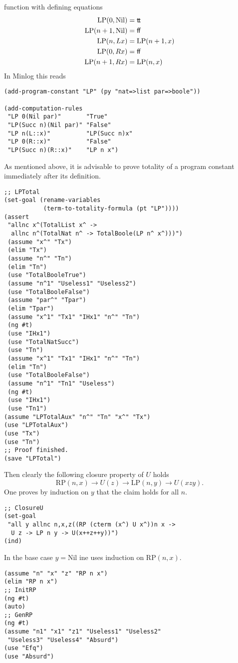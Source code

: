 \documentclass[12pt]{amsart}
\newcommand{\nil}{\mathrm{Nil}}
\newcommand{\false}{\mathsf{f\kern-0.14em f}}
\newcommand{\true}{\mathsf{t\kern-0.14em t}}
\begin{document}
function with defining equations
\begin{align*}
  \mathrm{LP}(0,\nil) &= \true
  \\
  \mathrm{LP}(n+1,\nil) &= \false
  \\
  \mathrm{LP}(n,Lx) &= \mathrm{LP}(n+1,x)
  \\
  \mathrm{LP}(0,Rx) &= \false
  \\
  \mathrm{LP}(n+1,Rx) &= \mathrm{LP}(n,x)
\end{align*}
In Minlog this reads
\begin{verbatim}
(add-program-constant "LP" (py "nat=>list par=>boole"))

(add-computation-rules
 "LP 0(Nil par)"       "True"
 "LP(Succ n)(Nil par)" "False"
 "LP n(L::x)"          "LP(Succ n)x"
 "LP 0(R::x)"          "False"
 "LP(Succ n)(R::x)"    "LP n x")
\end{verbatim}
As mentioned above, it is advisable to prove totality of a program
constant immediately after its definition.
\begin{verbatim}
;; LPTotal
(set-goal (rename-variables
           (term-to-totality-formula (pt "LP"))))
(assert
 "allnc x^(TotalList x^ ->
  allnc n^(TotalNat n^ -> TotalBoole(LP n^ x^)))")
 (assume "x^" "Tx")
 (elim "Tx")
 (assume "n^" "Tn")
 (elim "Tn")
 (use "TotalBooleTrue")
 (assume "n^1" "Useless1" "Useless2")
 (use "TotalBooleFalse")
 (assume "par^" "Tpar")
 (elim "Tpar")
 (assume "x^1" "Tx1" "IHx1" "n^" "Tn")
 (ng #t)
 (use "IHx1")
 (use "TotalNatSucc")
 (use "Tn")
 (assume "x^1" "Tx1" "IHx1" "n^" "Tn")
 (elim "Tn")
 (use "TotalBooleFalse")
 (assume "n^1" "Tn1" "Useless")
 (ng #t)
 (use "IHx1")
 (use "Tn1")
(assume "LPTotalAux" "n^" "Tn" "x^" "Tx")
(use "LPTotalAux")
(use "Tx")
(use "Tn")
;; Proof finished.
(save "LPTotal")
\end{verbatim}
Then clearly the following closure property of $U$ holds
\begin{equation*}
  \mathrm{RP}(n,x) \to U(z) \to \mathrm{LP}(n,y) \to U(xzy).
\end{equation*}
One proves by induction on $y$ that the claim holds for all $n$.
\begin{verbatim}
;; ClosureU
(set-goal
 "all y allnc n,x,z((RP (cterm (x^) U x^))n x ->
  U z -> LP n y -> U(x++z++y))")
(ind)
\end{verbatim}
In the base case $y=\nil$ ine uses induction on $\mathrm{RP}(n,x)$.
\begin{verbatim}
(assume "n" "x" "z" "RP n x")
(elim "RP n x")
;; InitRP
(ng #t)
(auto)
;; GenRP
(ng #t)
(assume "n1" "x1" "z1" "Useless1" "Useless2"
 "Useless3" "Useless4" "Absurd")
(use "Efq")
(use "Absurd")
\end{verbatim}
\end{document}
